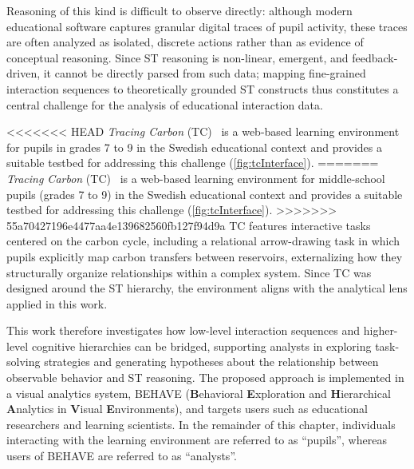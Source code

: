 Reasoning of this kind is difficult to observe directly: although modern educational software captures granular digital traces of pupil activity, these traces are often analyzed as isolated, discrete actions rather than as evidence of conceptual reasoning.
Since ST reasoning is non-linear, emergent, and feedback-driven, it cannot be directly parsed from such data; mapping fine-grained interaction sequences to theoretically grounded ST constructs thus constitutes a central challenge for the analysis of educational interaction data.

<<<<<<< HEAD
\textit{Tracing Carbon} (TC)~\cite{mani2026designing} is a web-based learning environment for pupils in grades 7 to 9 in the Swedish educational context and provides a suitable testbed for addressing this challenge (\cref{fig:tcInterface}).
=======
\textit{Tracing Carbon} (TC)~\cite{mani2026designing} is a web-based learning environment for middle-school pupils (grades 7 to 9) in the Swedish educational context and provides a suitable testbed for addressing this challenge (\cref{fig:tcInterface}).
>>>>>>> 55a70427196e4477aa4e139682560fb127f94d9a
TC features interactive tasks centered on the carbon cycle, including a relational arrow-drawing task in which pupils explicitly map carbon transfers between reservoirs, externalizing how they structurally organize relationships within a complex system.
Since TC was designed around the ST hierarchy, the environment aligns with the analytical lens applied in this work.

This work therefore investigates how low-level interaction sequences and higher-level cognitive hierarchies can be bridged, supporting analysts in exploring task-solving strategies and generating hypotheses about the relationship between observable behavior and ST reasoning.
The proposed approach is implemented in a visual analytics system, \textsc{BEHAVE} (\textbf{B}ehavioral \textbf{E}xploration and \textbf{H}ierarchical \textbf{A}nalytics in \textbf{V}isual \textbf{E}nvironments), and targets users such as educational researchers and learning scientists.
In the remainder of this chapter, individuals interacting with the learning environment are referred to as ``pupils'', whereas users of \textsc{BEHAVE} are referred to as ``analysts''.

